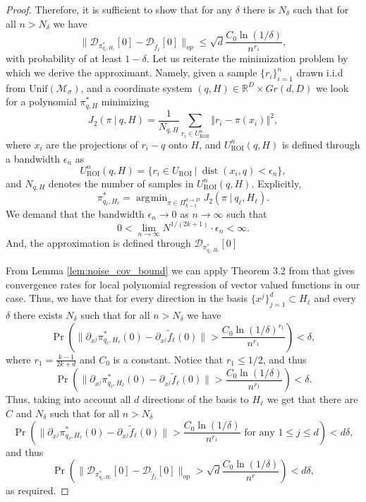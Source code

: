 \documentclass[12pt]{article}
\theoremstyle{remark}
\newcommand{\RR}{\mathbb{R}}
\newcommand{\MM}{\mathcal{M}}
\newcommand{\DD}{\mathcal{D}}
\newcommand{\norm}[1]{\left\Vert #1 \right\Vert}
\newcommand{\dist}{\operatorname{dist}}
\newcommand{\wtilde}[1]{\widetilde{#1}}
\DeclareMathOperator*{\argmin}{\arg\!\min}
\begin{document}
\begin{appendices}
\begin{proof}
Therefore, it is sufficient to show that for any $\delta$ there is $N_\delta$ such that for all $n>N_\delta$ we have 
\[
\|{\DD_{\pi^*_{q_\ell, H_\ell}}[0] - \DD_{ \wtilde f_\ell}[0]}\|_{op} \leq \sqrt{d}\frac{C_0 \ln(1/\delta)}{n^{r_1}}
,\]
with probability of at least $1 - \delta$.
Let us reiterate the minimization problem by which we derive the approximant.
Namely, given a sample $ \{r_i\}_{i=1}^{n} $ drawn i.i.d from $ \text{Unif}(\MM_\sigma) $, and a coordinate system $ (q, H)\in \RR^D\times Gr(d,D) $ we look for a polynomial $ \pi^*_{q,H} $ minimizing
\begin{equation}\label{eq:Step2_sample}
J_2(\pi ~|~ q, H) = \frac{1}{N_{q,H}}\sum_{r_i \in U_{\textrm{ROI}}^{n}} \norm{r_i - \pi(x_i)}^2
,\end{equation}
where $x_i$ are the projections of $r_i - q$ onto $H$, and $U_{\textrm{ROI}}^{n}(q,H)$ is defined through a bandwidth $\epsilon_{n}$ as
\begin{equation}\label{eq:ROI_ell_sample}
U_{\textrm{ROI}}^{n}(q,H) = {\{r_i\in U_\textrm{ROI}~|~\dist(x_i, q)<\epsilon_{n}\}}
,\end{equation}
and $N_{q,H}$ denotes the number of samples in $U_{\textrm{ROI}}^{n}(q, H)$.
Explicitly,
\begin{equation}\label{eq:argmin2_sample}
\pi^*_{q_\ell, H_\ell} = \argmin_{\pi\in \Pi_{k-1}^{d\mapsto D}} J_2(\pi ~|~ q_\ell, H_\ell)
.\end{equation}
We demand that the bandwidth $\epsilon_{n}\to 0$ as ${n}\to\infty$ such that 
\begin{equation}\label{eq:bandwidthDecay_sample}
0<\lim_{{n}\rightarrow\infty}N^{1/(2k+1)}\cdot \epsilon_{n} < \infty
.\end{equation}
And, the approximation is defined through $\DD_{\pi^*_{q_\ell, H_\ell}}[0]$


From Lemma \ref{lem:noise_cov_bound} we can apply Theorem 3.2 from \cite{aizenbud2021VectorEstimation} that gives convergence rates for local polynomial regression of vector valued functions in our case. Thus, we have that for every direction in the basis $\{x^j\}_{j=1}^d\subset H_\ell$ and every $\delta$ there exists  $N_{\delta}$ such that for all $n > N_{\delta}$ we have
\[
\Pr(\|{\partial_{x^j} \pi^*_{q_\ell, H_\ell}(0) - \partial_{x^j} \wtilde f_\ell(0)}\| > \frac{C_0 \ln(1/\delta)^{r_1}}{n^{r_1}}) < \delta
,\]
where $r_1 = \frac{k-1}{2k + d}$ and $C_0$ is a constant. Notice that $r_1 \leq 1/2$, and thus 
\[
\Pr(\|{\partial_{x^j} \pi^*_{q_\ell, H_\ell}(0) - \partial_{x^j} \wtilde f_\ell(0)}\| > \frac{C_0 \ln(1/\delta)}{n^{r_1}}) < \delta
.\]
Thus, taking into account all $d$ directions of the basis to $H_\ell$ we get that there are $C$ and $N_\delta$ such that for all $n > N_\delta$  
\[
\Pr(\|{\partial_{x^j} \pi^*_{q_\ell, H_\ell}(0) - \partial_{x^j} \wtilde f_\ell(0)}\| > \frac{C_0 \ln(1/\delta)}{n^{r_1}}\textrm{ for any } 1 \leq j \leq d) < d\delta
,\]
and thus
\[
\Pr(\|{\DD_{\pi^*_{q_\ell, H_\ell}}[0] - \DD_{\wtilde f_\ell}[0]}\|_{op} > \sqrt{d}\frac{C_0 \ln(1/\delta)}{n^r}) < d\delta
,\]
as required.
\end{proof}


\end{appendices}
\end{document}
